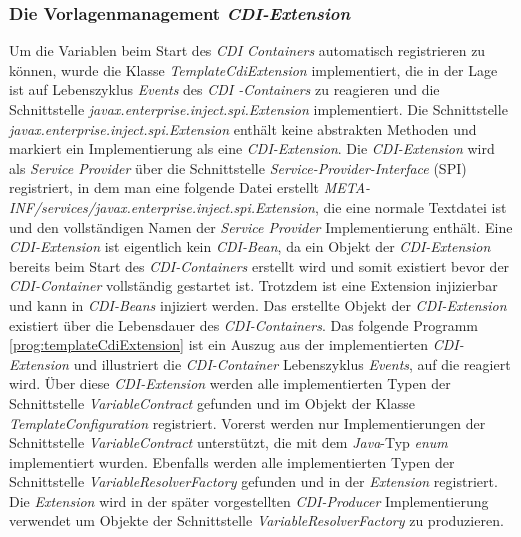 \subsubsection{Die Vorlagenmanagement \emph{CDI-Extension}}
Um die Variablen beim Start des \emph{CDI Containers} automatisch registrieren zu können, wurde die Klasse \emph{TemplateCdiExtension} implementiert, die in der Lage ist auf Lebenszyklus \emph{Events} des \emph{CDI -Containers} zu reagieren und die Schnittstelle \emph{javax.enterprise.inject.spi.Extension} implementiert. Die Schnittstelle \emph{javax.enterprise.inject.spi.Extension} enthält keine abstrakten Methoden und markiert ein Implementierung als eine \emph{CDI-Extension}. Die \emph{CDI-Extension} wird als \emph{Service Provider} über die Schnittstelle \emph{Service-Provider-Interface} (SPI) registriert, in dem man eine folgende Datei erstellt \emph{META-INF/services/javax.enterprise.inject.spi.Extension}, die eine normale Textdatei ist und den vollständigen Namen der \emph{Service Provider} Implementierung enthält. 
\newline
\newline
Eine \emph{CDI-Extension} ist eigentlich kein \emph{CDI-Bean}, da ein Objekt der \emph{CDI-Extension} bereits beim Start des \emph{CDI-Containers} erstellt wird und somit existiert bevor der \emph{CDI-Container} vollständig gestartet ist. Trotzdem ist eine Extension injizierbar und kann in \emph{CDI-Beans} injiziert werden. Das erstellte Objekt der \emph{CDI-Extension} existiert über die Lebensdauer des \emph{CDI-Containers}.
\newline
\newline
Das folgende Programm \ref{prog:templateCdiExtension} ist ein Auszug aus der implementierten \emph{CDI-Extension} und illustriert die \emph{CDI-Container} Lebenszyklus \emph{Events}, auf die reagiert wird. Über diese \emph{CDI-Extension} werden alle implementierten Typen der Schnittstelle \emph{VariableContract} gefunden und im Objekt der Klasse \emph{TemplateConfiguration} registriert. Vorerst werden nur Implementierungen der Schnittstelle \emph{VariableContract} unterstützt, die mit dem \emph{Java}-Typ \emph{enum} implementiert wurden. Ebenfalls werden alle implementierten Typen der Schnittstelle \emph{VariableResolverFactory} gefunden und in der \emph{Extension} registriert. Die \emph{Extension} wird  in der später vorgestellten \emph{CDI-Producer} Implementierung verwendet um Objekte der Schnittstelle \emph{VariableResolverFactory} zu produzieren. 
\newpage
